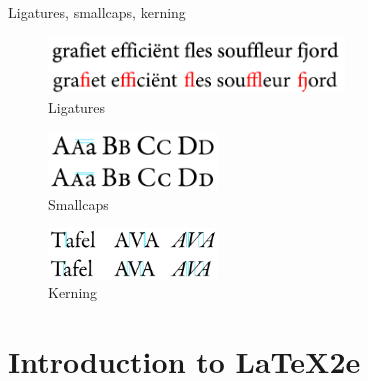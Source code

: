 \documentclass[10pt,times]{beamer}
\begin{document}
\begin{frame}{Ligatures, smallcaps, kerning}
\begin{figure}
  \centering
  \includegraphics[width=0.7\textwidth]{figs/ligatures.png}
  \caption*{Ligatures}
\end{figure}
\begin{figure}
  \centering
  \includegraphics[width=0.4\textwidth]{figs/smallcaps.png}
  \caption*{Smallcaps}
\end{figure}
\begin{figure}
  \centering
  \includegraphics[width=0.4\textwidth]{figs/kerning.png}
  \caption*{Kerning}
\end{figure}
\end{frame}


\section{Introduction to \LaTeX2e}
\end{document}
